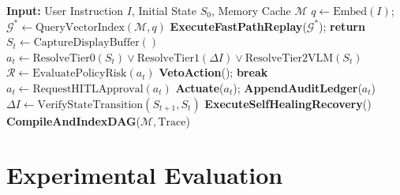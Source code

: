 \documentclass[10pt]{article}
\begin{document}
\begin{algorithm}[t]
\caption{Surget.AI Execution Runtime Loop}
\label{alg:runtime}
\begin{algorithmic}[1]
\STATE \textbf{Input:} User Instruction $I$, Initial State $S_0$, Memory Cache $\mathcal{M}$
\STATE $q \leftarrow \text{Embed}(I)$; $\mathcal{G}^* \leftarrow \text{QueryVectorIndex}(\mathcal{M}, q)$
    \STATE \textbf{ExecuteFastPathReplay}($\mathcal{G}^*$); \textbf{return}
\ENDIF
{}
    \STATE $S_t \leftarrow \text{CaptureDisplayBuffer}()$
    \STATE $a_t \leftarrow \text{ResolveTier0}(S_t) \lor \text{ResolveTier1}(\Delta I) \lor \text{ResolveTier2VLM}(S_t)$
    \STATE $\mathcal{R} \leftarrow \text{EvaluatePolicyRisk}(a_t)$
        \STATE \textbf{VetoAction}(); \textbf{break}
        \STATE $a_t \leftarrow \text{RequestHITLApproval}(a_t)$
    \ENDIF
    \STATE \textbf{Actuate}($a_t$); \textbf{AppendAuditLedger}($a_t$)
    \STATE $\Delta I \leftarrow \text{VerifyStateTransition}(S_{t+1}, S_t)$
        \STATE \textbf{ExecuteSelfHealingRecovery}()
    \ENDIF
\ENDWHILE
\STATE \textbf{CompileAndIndexDAG}($\mathcal{M}, \text{Trace}$)
\end{algorithmic}
\end{algorithm}

\section{Experimental Evaluation}
\label{sec:experiments}
\end{document}
